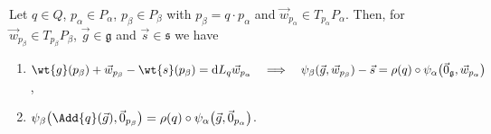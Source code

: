 \begin{Corollary}
\label{cor:psialpha}
Let $q\in Q$, $p_\alpha\in P_\alpha$, $p_\beta\in P_\beta$ with $p_\beta=q\cdot p_\alpha$ and $\vec{w}_{p_\alpha}\in
T_{p_\alpha}P_\alpha$.
Then, for $\vec{w}_{p_\beta}\in T_{p_\beta}P_\beta$, $\vec{g}\in \mathfrak{g}$ and $\vec{s}\in \mathfrak{s}$ we have
\begin{enumerate}\itemsep=0pt
\item[$i)$] $\wt{g}(p_\beta) + \vec{w}_{p_\beta}-\wt{s}(p_\beta)=\mathrm{d} L_q\vec{w}_{p_\alpha}
\quad
\Longrightarrow
\quad
\psi_\beta(\vec{g},\vec{w}_{p_\beta})-\vec{s}
=\rho(q)\circ\psi_\alpha\big(\vec{0}_{\mathfrak{g}},\vec{w}_{p_\alpha}\big)$,
\item[$ii)$] $\psi_\beta\big(\Add{q}(\vec{g}),\vec{0}_{p_\beta}\big)=\rho(q)\circ
\psi_\alpha\big(\vec{g},\vec{0}_{p_\alpha}\big)$.
\end{enumerate}
\end{Corollary}

